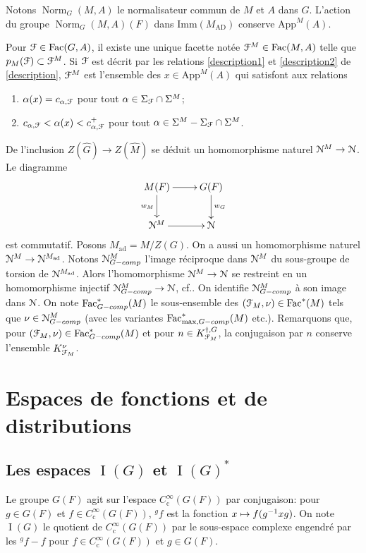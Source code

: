 \documentclass[11pt]{article}
\newcommand{\cf}{cf.\xspace}
\numberwithin{equation}{section}\providecommand{\og}{«\,}\providecommand{\fg}{\,»}
\let\mathcal \EuScript
\newcommand\mto{\mathchoice{\longmapsto}{\mapsto}{\mapsto}{\mapsto}}
\newcommand{\gf}{{}^g\!f}
\newcommand{\AD}{\mathrm{AD}}
\newcommand{\App}{\mathrm{App}}
\newcommand{\rc}{\mathrm{c}}
\newcommand{\tcomp}{\textup{-comp}}
\newcommand{\Fac}{\mathrm{Fac}}
\newcommand{\Imm}{\mathrm{Imm}}
\DeclareMathOperator{\ad}{ad}
\DeclareMathOperator{\rI}{I}
\DeclareMathOperator{\Norm}{Norm}
\newcommand{\cF}{\mathcal{F}}
\newcommand{\cN}{\mathcal{N}}
\theoremstyle{plain}
\theoremstyle{definition}
\begin{document}
Notons $\Norm_{G}(M,A)$ le normalisateur commun de $M$ et $A$ dans $G$. L'action du groupe $\Norm_{G}(M,A)(F)$ dans $\Imm(M_{\AD})$ conserve $\App^M(A)$.

Pour $\cF\in \Fac(G,A)$, il existe une unique facette notée $\cF^{M}\in \Fac(M,A)$ telle que $p_{M}(\cF)\subset \cF^{M}$. Si $\cF$ est décrit par les relations \eqref{description1} et \eqref{description2} de \ref{description}, $\cF^{M}$ est l'ensemble des $x\in \App^M(A)$ qui satisfont aux relations
\begin{enumerate}
\item\label{groupesdelevi1}
$\alpha(x)=c_{\alpha,\cF}$ pour tout $\alpha\in \Sigma_{\cF}\cap \Sigma^M$;

\item\label{groupesdelevi2}
$c_{\alpha,\cF}<\alpha(x)<c_{\alpha,\cF}^+$ pour tout $\alpha\in \Sigma^M-\Sigma_{\cF}\cap \Sigma^M$.
\end{enumerate}

De l'inclusion $Z(\hat{G})\to Z(\hat{M})$ se déduit un homomorphisme naturel $\cN^M\to \cN$. Le diagramme
\[
\xymatrix{
M(F)\ar[r]\ar[d]_{w_{M}}&G(F)\ar[d]^{w_{G}}\\
\cN^M\ar[r]&\cN
}
\]
est commutatif. Posons $M_{\ad}=M/Z(G)$. On a aussi un homomorphisme naturel $\cN^M\to \cN^{M_{\ad}}$. Notons $\cN_{G\tcomp}^M$ l'image réciproque dans $\cN^M$ du sous-groupe de torsion de $\cN^{M_{\ad}}$. Alors l'homomorphisme $\cN^M\to \cN$ se restreint en un homomorphisme injectif $\cN^M_{G\tcomp}\to \cN$, \cf \cite[6(1)]{W2}. On identifie $\cN^M_{G\tcomp}$ à son image dans $\cN$. On note $\Fac^*_{G\tcomp}(M)$ le sous-ensemble des $(\cF_{M},\nu)\in \Fac^*(M)$ tels que $\nu\in \cN^M_{G\tcomp}$ (avec les variantes $\Fac^*_{\max,G\tcomp}(M)$ etc.). Remarquons que, pour $(\cF_{M},\nu)\in \Fac^*_{G\tcomp}(M)$ et pour $n\in K_{\cF_{M}}^{\dag,G}$, la conjugaison par $n$ conserve l'ensemble $K_{\cF_{M}}^{\nu}$.

\section{Espaces de fonctions et de distributions}

\subsection{Les espaces \texorpdfstring{$\rI(G)$ et $\rI(G)^*$}{GetG}}\label{lesespaces}

Le groupe $G(F)$ agit sur l'espace $C_{\rc}^{\infty}(G(F))$ par conjugaison: pour $g\in G(F)$ et $f\in C_{\rc}^{\infty}(G(F))$, $\gf$ est la fonction $x\mto f(g^{-1}xg)$. On note $\rI(G)$ le quotient de $C_{\rc}^{\infty}( G(F))$ par le sous-espace complexe engendré par les $\gf-f$ pour $f\in C_{\rc}^{\infty}(G(F))$ et $g\in G(F)$.
\end{document}
